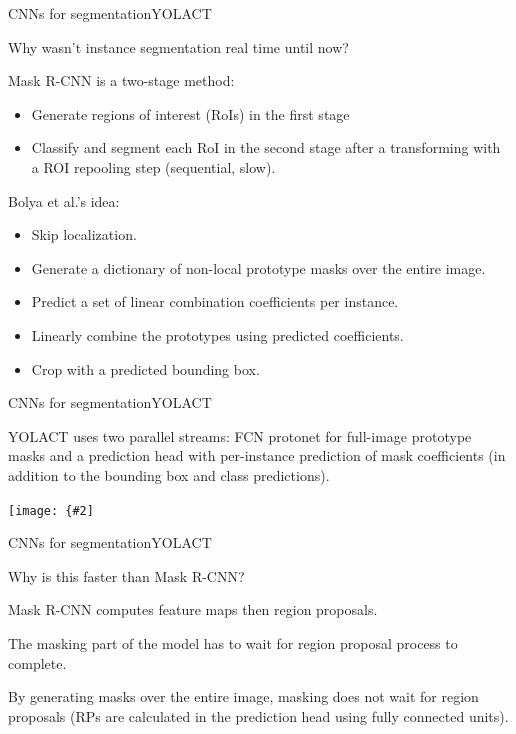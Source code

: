 \documentclass[aspectratio=169]{beamer}
\newcommand{\myfig}[3]{\centerline{\texttt{[image: \{\#2]}}}
\begin{document}
\begin{frame}{CNNs for segmentation}{YOLACT}

  Why wasn't instance segmentation real time until now?

  \medskip

  Mask R-CNN is a \alert{two-stage} method:
  \begin{itemize}
  \item Generate regions of interest (RoIs) in the first stage
  \item Classify and segment each RoI in the second stage after a
    transforming with a ROI repooling step (sequential, slow).
  \end{itemize}

  \medskip

  Bolya et al.'s idea:
  \begin{itemize}
  \item \alert{Skip localization}.
  \item Generate a dictionary of \alert{non-local prototype masks}
    over the entire image.
  \item Predict a set of \alert{linear combination coefficients} per
    instance.
  \item \alert{Linearly combine the prototypes} using predicted
    coefficients.
  \item \alert{Crop} with a predicted bounding box.
  \end{itemize}
  
\end{frame}


\begin{frame}{CNNs for segmentation}{YOLACT}

  YOLACT uses two parallel streams: FCN \alert{protonet} for
  full-image prototype masks and a \alert{prediction head} with
  per-instance prediction of mask coefficients (in addition to the
  bounding box and class predictions).
  
  \myfig{5in}{bolya-fig2}{Bolya, Zhou, Xiao, and Lee (2019), Fig.\ 2}

\end{frame}


\begin{frame}{CNNs for segmentation}{YOLACT}

  Why is this faster than Mask R-CNN?

  \medskip

  Mask R-CNN computes feature maps then region proposals.

  \medskip

  The masking part of the model has to wait for region proposal process to
  complete.

  \medskip

  By generating masks \alert{over the entire image}, masking does not
  wait for region proposals (RPs are calculated in the prediction head
  using fully connected units).

\end{frame}
\end{document}

